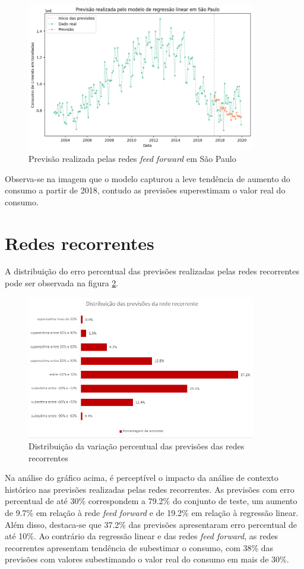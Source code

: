 \begin{figure}[H]
    \centering
    \includegraphics[width=10cm]{../figuras/graficos/mlp/prev_sp.png}
    \caption{Previsão realizada pelas redes \textit{feed forward} em São Paulo}
    \label{img:consumo-sp-rff}
\end{figure}

Observa-se na imagem que o modelo capturou a leve tendência de aumento do 
consumo a partir de 2018, contudo as previsões superestimam o valor real 
do consumo.

\section{Redes recorrentes}

A distribuição do erro percentual das previsões realizadas pelas redes 
recorrentes pode ser observada na figura \ref{img:erro-perc-rnn}.

\begin{figure}[H]
    \centering
    \includegraphics[width=10cm]{../figuras/graficos/rnn/erro-perc-rnn.png}
    \caption{Distribuição da variação percentual das previsões das redes recorrentes}
    \label{img:erro-perc-rnn}
\end{figure}

Na análise do gráfico acima, é perceptível o impacto da análise de contexto histórico 
nas previsões realizadas pelas redes recorrentes. As previsões com erro percentual 
de até 30\% correspondem a 79.2\% do conjunto de teste, um aumento de 9.7\% em 
relação à rede \textit{feed forward} e de 19.2\% em relação à regressão linear.
Além disso, destaca-se que 37.2\% das previsões apresentaram erro percentual 
de até 10\%. Ao contrário da regressão linear e das redes \textit{feed forward},
as redes recorrentes apresentam tendência de subestimar o consumo, com 38\% das
previsões com valores subestimando o valor real do consumo em mais de 30\%.

